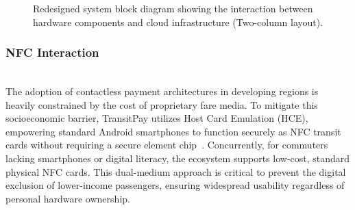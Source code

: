 \documentclass[manuscript,review,anonymous]{acmart}
\begin{document}
\begin{figure}[t]
  \centering
  \caption{Redesigned system block diagram showing the interaction between hardware components and cloud infrastructure (Two-column layout).}
  \label{fig:system_block}
\end{figure}

\subsubsection{NFC Interaction} \mbox{} \\

The adoption of contactless payment architectures in developing regions is heavily constrained by the cost of proprietary fare media. To mitigate this socioeconomic barrier, TransitPay utilizes Host Card Emulation (HCE), empowering standard Android smartphones to function securely as NFC transit cards without requiring a secure element chip~\cite{alliance2014host}. Concurrently, for commuters lacking smartphones or digital literacy, the ecosystem supports low-cost, standard physical NFC cards. This dual-medium approach is critical to prevent the digital exclusion of lower-income passengers, ensuring widespread usability regardless of personal hardware ownership. 
\end{document}

